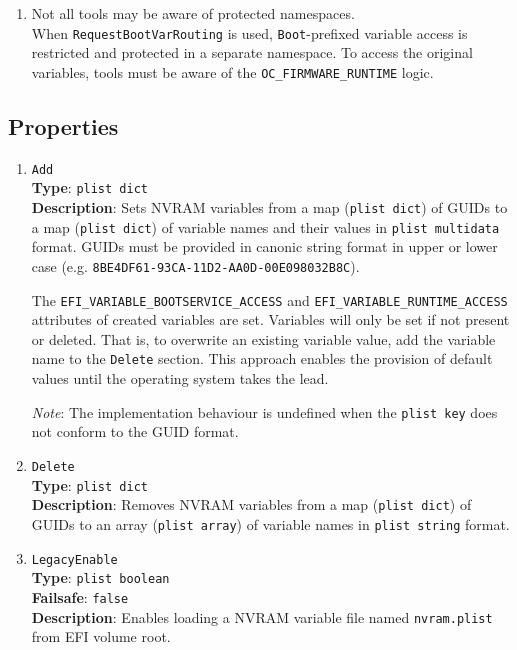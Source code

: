 \documentclass[]{article}
\begin{document}
\begin{enumerate}
\item Not all tools may be aware of protected namespaces.\\
  When \texttt{RequestBootVarRouting} is used, \texttt{Boot}-prefixed variable access
  is restricted and protected in a separate namespace. To access the original variables,
  tools must be aware of the \texttt{OC\_FIRMWARE\_RUNTIME} logic.
\end{enumerate}

\subsection{Properties}\label{nvramprops}

\begin{enumerate}
\item
  \texttt{Add}\\
  \textbf{Type}: \texttt{plist\ dict}\\
  \textbf{Description}: Sets NVRAM variables from a map (\texttt{plist\ dict})
  of GUIDs to a map (\texttt{plist\ dict}) of variable names and their values
  in \texttt{plist\ multidata} format. GUIDs must be provided in canonic string
  format in upper or lower case (e.g. \texttt{8BE4DF61-93CA-11D2-AA0D-00E098032B8C}).

  The \texttt{EFI\_VARIABLE\_BOOTSERVICE\_ACCESS} and \texttt{EFI\_VARIABLE\_RUNTIME\_ACCESS}
  attributes of created variables are set. Variables will only be set if not present or deleted.
  That is, to overwrite an existing variable value, add the variable name to the \texttt{Delete} section.
  This approach enables the provision of default values until the operating system takes the lead.

  \emph{Note}: The implementation behaviour is undefined when the \texttt{plist\ key}
  does not conform to the GUID format.

\item
  \texttt{Delete}\\
  \textbf{Type}: \texttt{plist\ dict}\\
  \textbf{Description}: Removes NVRAM variables from a map (\texttt{plist\ dict})
  of GUIDs to an array (\texttt{plist\ array}) of variable names in
  \texttt{plist\ string} format.

\item
  \texttt{LegacyEnable}\\
  \textbf{Type}: \texttt{plist\ boolean}\\
  \textbf{Failsafe}: \texttt{false}\\
  \textbf{Description}: Enables loading a NVRAM variable file named \texttt{nvram.plist}
  from EFI volume root.


\end{enumerate}
\end{document}
